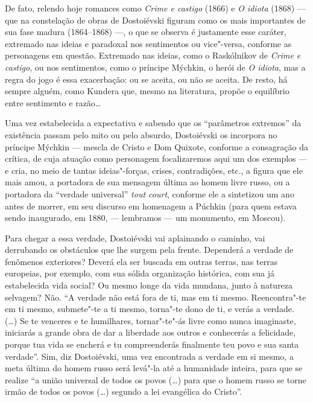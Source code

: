 De fato, relendo hoje romances como \emph{Crime e castigo} (1866)
e \emph{O idiota} (1868) --- que na constelação de obras de Dostoiévski
figuram como os mais importantes de sua fase madura (1864--1868) ---, o que se observa é justamente esse caráter, extremado nas ideias e
paradoxal nos sentimentos ou vice"-versa, conforme as personagens em
questão. Extremado nas ideias, como o Raskólnikov
de \emph{Crime e castigo}, ou nos sentimentos, como o príncipe
Mýchkin, o herói de \emph{O idiota}, mas a regra do jogo é essa
exacerbação: ou se aceita, ou não se aceita. De resto, há sempre alguém,
como Kundera que, mesmo na literatura, propõe o equilíbrio entre
sentimento e razão\ldots{}

Uma vez estabelecida a expectativa e sabendo que os ``parâmetros
extremos'' da existência passam pelo mito ou pelo absurdo, Dostoiévski
os incorpora no príncipe Mýchkin --- mescla de Cristo e Dom Quixote,
conforme a consagração da crítica, de cuja atuação como personagem
focalizaremos aqui um dos exemplos --- e cria, no meio de tantas
ideias"-forças, crises, contradições, etc., a figura que ele mais amou,
a portadora de sua mensagem última ao homem livre russo, ou
a portadora da ``verdade universal'' \emph{tout court}, conforme ele a
sintetizou um ano antes de morrer, em seu discurso em homenagem a
Púchkin (para quem estava sendo inaugurado, em 1880, --- lembramos --- um monumento, em
Moscou).

Para chegar a essa verdade, Dostoiévski vai aplainando o caminho, vai
derrubando os obstáculos que lhe surgem pela frente. Dependerá a verdade
de fenômenos exteriores? Deverá ela ser buscada em outras terras, nas
terras europeias, por exemplo, com sua sólida organização histórica, com
sua já estabelecida vida social? Ou mesmo longe da vida mundana, junto à
natureza selvagem? Não. ``A verdade não está fora de ti, mas em ti
mesmo. Reencontra"-te em ti mesmo, submete"-te a ti mesmo, torna"-te dono
de ti, e verás a verdade. (\ldots{}) Se te venceres e te humilhares,
tornar"-te"-ás livre como nunca imaginaste, iniciarás a grande obra de
dar a liberdade aos outros e conhecerás a felicidade, porque tua vida se
encherá e tu compreenderás finalmente teu povo e sua santa verdade''.
Sim, diz Dostoiévski, uma vez encontrada a verdade em si mesmo, a meta
última do homem russo será levá"-la até a humanidade inteira, para que se
realize ``a união universal de todos os povos (\ldots{}) para que o homem
russo se torne irmão de todos os povos (\ldots{}) segundo a lei evangélica do
Cristo''.

